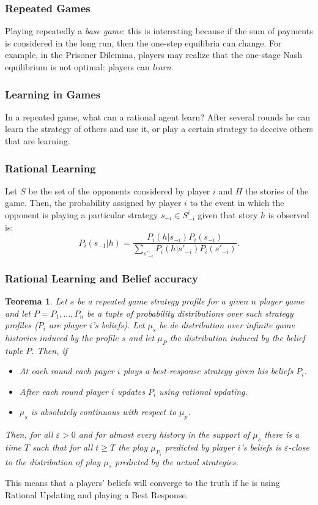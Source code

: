 \documentclass{beamer}
\theoremstyle{plain}
\newtheorem{teo}{Teorema}
\begin{document}
\begin{frame}
\frametitle{Repeated Games}
Playing repeatedly a \textit{base game}: this is interesting because if the sum of payments is considered in the long run, then the one-step equilibria can change. For example, in the Prisoner Dilemma, players may realize that the one-stage Nash equilibrium is not optimal: players can \textit{learn}.
\end{frame}

\begin{frame}
\frametitle{Learning in Games}
In a repeated game, what can a rational agent learn? After several rounds he can learn the strategy of others and use it, or play a certain strategy to deceive others that are learning. 
\end{frame}

\begin{frame}
\frametitle{Rational Learning}
Let $S$ be the set of the opponents considered by player $i$ and $H$ the stories of the game. Then, the probability assigned by player $i$ to the event in which the opponent is playing a particular strategy $s_{-i} \in S^i_{-i}$ given that story $h$ is observed is:
\[ P_i(s_{-1} | h) = \frac{P_i(h|s_{-i})P_i(s_{-i})}{\sum_{s'_{-i}} P_i(h | s'_{-i})P_i(s'_{-i})}. \]
\end{frame}
\begin{frame}
\frametitle{Rational Learning and Belief accuracy}
\begin{teo}
Let $s$ be a repeated game strategy profile  for a given $n$ player game and let $P=P_1,...,P_n$ be a tuple of probability distributions over such strategy profiles ($P_i$ are player $i$'s beliefs). Let $\mu_s$ be de distribution over infinite game histories induced by the profile $s$ and let $\mu_P$ the distribution induced by the belief tuple $P$. Then, if
\begin{itemize}
\item At each round each payer $i$ plays a best-response strategy given his beliefs $P_i$.
\item After each round player $i$ updates $P_i$ using rational updating.
\item $\mu_s$ is absolutely continuous with respect to $\mu_p$.
\end{itemize}
Then, for all $\varepsilon > 0$ and for almost every history in the support of $\mu_s$ there is a time $T$ such that for all $t \geq T$ the play $\mu_{P_i}$ predicted by player $i$'s beliefs is $\varepsilon$-close to the distribution of play $\mu_s$ predicted by the actual strategies.
\end{teo}
\end{frame}
\begin{frame}
This means that a players' beliefs will converge to the truth if he is using Rational Updating and playing a Best Response.
\end{frame}
\end{document}
